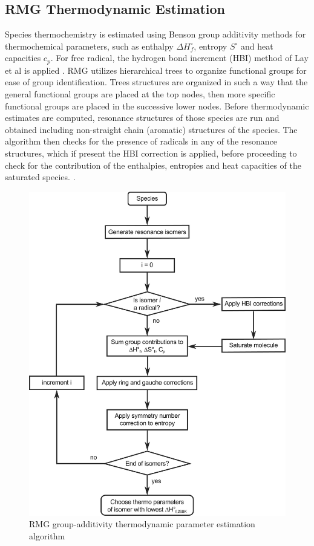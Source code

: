  \subsection{RMG Thermodynamic Estimation}
 Species thermochemistry is estimated using Benson group additivity methods \cite{Benson1958AdditivityProperties}\cite{Benson:452788}for thermochemical parameters, such as enthalpy $\Delta H_f^{\circ}$, entropy $S^{\circ}$ and heat capacities $c_p$. For free radical, the hydrogen bond increment (HBI) method of Lay et al is applied \cite{Lay1995HydrogenSpecies}. RMG utilizes hierarchical trees to organize functional groups for ease of group identification. Trees structures are organized in such a way that the general functional groups are placed at the top nodes, then more specific functional groups are placed in the successive lower nodes.  Before thermodynamic estimates are computed, resonance structures of those species are run and obtained including non-straight chain (aromatic) structures of the species. The algorithm then checks for the presence of radicals in any of the resonance structures, which if present the HBI correction is applied, before proceeding to check for the contribution of the enthalpies, entropies and heat capacities of the saturated species. .
 \begin{figure}[ht]
     \centering
     \includegraphics[scale=0.85]{images/tree-structure.jpg}
     \caption{RMG group-additivity thermodynamic parameter estimation algorithm \cite{Gao2016ReactionMechanisms}}
     \label{fig:tree}
 \end{figure}
